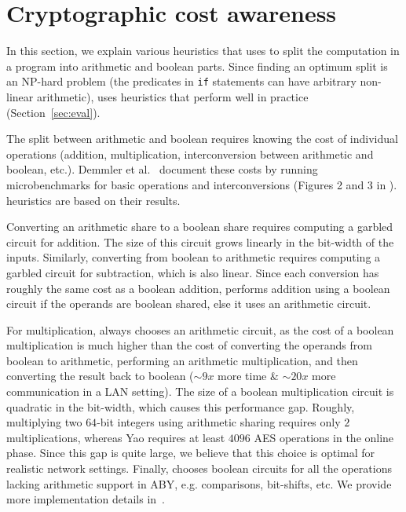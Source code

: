 \section{Cryptographic cost awareness}
 \label{sec:ccc}
In this section, we explain various heuristics that \tool uses to split
the computation in a program into arithmetic and
boolean parts. Since finding an optimum split  is an NP-hard problem (the predicates in {\tt if} statements can have arbitrary non-linear arithmetic),
\tool uses heuristics  that  perform well in practice (Section~\ref{sec:eval}).

The split
between arithmetic and boolean requires knowing the cost of
individual operations
(addition, multiplication, interconversion between arithmetic and boolean, etc.).
Demmler
et al.~\cite{aby} document these costs by running
microbenchmarks for basic operations and interconversions (Figures
2 and 3 in \cite{aby}). \tool heuristics are based on their results.

 Converting
an arithmetic share to a boolean share requires computing a garbled
circuit for addition. The size of this circuit grows  linearly in the bit-width of the inputs. Similarly, converting from boolean to arithmetic requires computing a 
garbled circuit for subtraction, which is also linear. 
Since each conversion has roughly the same cost as a boolean addition,
 \tool performs
addition using a boolean circuit
if the operands  are boolean shared, else it uses an arithmetic
circuit. 

For multiplication, \tool always chooses
an arithmetic circuit, as the cost of a boolean multiplication is much
higher than the cost of converting the operands from boolean to
arithmetic, performing an arithmetic multiplication, and then converting
the result back to boolean ($\sim9x$ more time $\&$ $\sim20x$ more
communication in a LAN setting). The size of a boolean multiplication circuit is quadratic in the bit-width, which causes this performance gap.
Roughly, multiplying two $64$-bit integers using arithmetic sharing requires only $2$ multiplications, whereas Yao requires at least $4096$ AES operations in the online phase.
Since this gap is quite large, we believe that this choice is optimal for realistic network
settings. Finally, \tool chooses boolean circuits for all
the operations lacking arithmetic support in ABY, e.g. comparisons, bit-shifts, etc.
We provide more implementation details in~.


